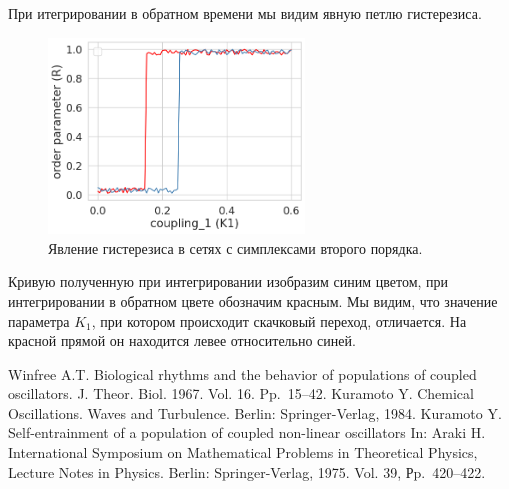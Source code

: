 При итегрировании в обратном времени мы видим явную петлю гистерезиса.
\begin{figure}
\center\includegraphics[height=5.2cm]{aRyabovris1.png}
 \caption{Явление гистерезиса в сетях с симплексами второго порядка.}
\end{figure}

Кривую полученную при интегрировании изобразим синим цветом, при интегрировании в обратном цвете обозначим красным. 
Мы видим, что значение параметра $K_1$, при котором происходит скачковый переход, отличается. На красной прямой он находится левее относительно синей. 


\begin{thebibliography}{99}
 Winfree A.T.  { Biological rhythms and the behavior of populations of coupled oscillators}.   J. Theor. Biol. 1967. Vol. 16.  Pp.~15--42.
Kuramoto Y. Chemical Oscillations. Waves and Turbulence. Berlin: Springer-Verlag, 1984.
 Kuramoto Y. {   Self-entrainment of a population of coupled non-linear oscillators In: Araki H}. International Symposium on Mathematical Problems in Theoretical Physics, Lecture Notes in Physics. Berlin: Springer-Verlag, 1975. Vol. 39, Рp.~420--422.
\end{thebibliography}





%

